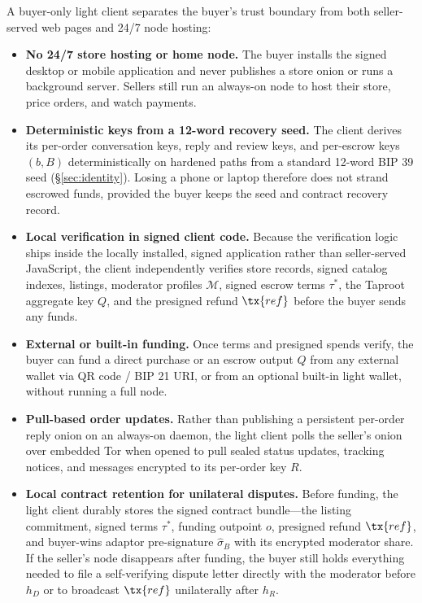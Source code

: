 A buyer-only light client separates the buyer's trust boundary from both seller-served web pages and 24/7 node hosting:
\begin{itemize}
  \item \textbf{No 24/7 store hosting or home node.} The buyer installs the signed desktop or mobile application and never publishes a store onion or runs a background server. Sellers still run an always-on node to host their store, price orders, and watch payments.
  \item \textbf{Deterministic keys from a 12-word recovery seed.} The client derives its per-order conversation keys, reply and review keys, and per-escrow keys $(b,B)$ deterministically on hardened paths from a standard 12-word BIP 39 seed (\S\ref{sec:identity}). Losing a phone or laptop therefore does not strand escrowed funds, provided the buyer keeps the seed and contract recovery record.
  \item \textbf{Local verification in signed client code.} Because the verification logic ships inside the locally installed, signed application rather than seller-served JavaScript, the client independently verifies store records, signed catalog indexes, listings, moderator profiles $\mathcal{M}$, signed escrow terms $\tau^\ast$, the Taproot aggregate key $Q$, and the presigned refund $\tx{ref}$ before the buyer sends any funds.
  \item \textbf{External or built-in funding.} Once terms and presigned spends verify, the buyer can fund a direct purchase or an escrow output $Q$ from any external wallet via QR code / BIP 21 URI, or from an optional built-in light wallet, without running a full node.
  \item \textbf{Pull-based order updates.} Rather than publishing a persistent per-order reply onion on an always-on daemon, the light client polls the seller's onion over embedded Tor when opened to pull sealed status updates, tracking notices, and messages encrypted to its per-order key $R$.
  \item \textbf{Local contract retention for unilateral disputes.} Before funding, the light client durably stores the signed contract bundle---the listing commitment, signed terms $\tau^\ast$, funding outpoint $o$, presigned refund $\tx{ref}$, and buyer-wins adaptor pre-signature $\hat\sigma_B$ with its encrypted moderator share. If the seller's node disappears after funding, the buyer still holds everything needed to file a self-verifying dispute letter directly with the moderator before $h_D$ or to broadcast $\tx{ref}$ unilaterally after $h_R$.
\end{itemize}

